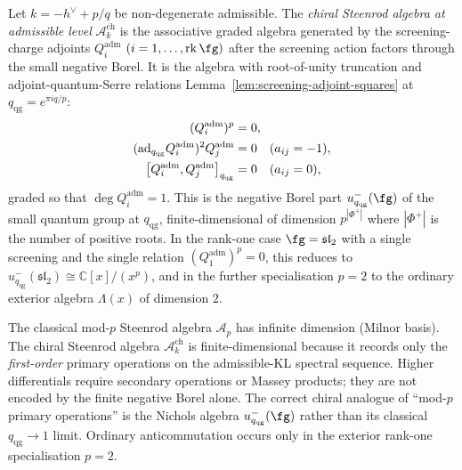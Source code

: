 \begin{definition}
\label{def:chiral-steenrod}
%
Let $k = -h^\vee + p/q$ be non-degenerate admissible. The
\emph{chiral Steenrod algebra at admissible level}
$\mathcal{A}^{\mathrm{ch}}_k$ is the associative graded algebra
generated by the screening-charge adjoints
$Q_i^{\mathrm{adm}}$ $(i = 1, \ldots, \mathrm{rk}\,\fg)$ after the
screening action factors through the small negative Borel.  It is
the algebra with root-of-unity truncation and adjoint-quantum-Serre
relations
Lemma~\ref{lem:screening-adjoint-squares} at
$q_{\mathrm{qg}} = e^{\pi i q/p}$:
\begin{align}\label{eq:chiral-steenrod-relations}
(Q_i^{\mathrm{adm}})^p &= 0, \notag \\
(\mathrm{ad}_{q_{\mathrm{qg}}} Q_i^{\mathrm{adm}})^2
Q_j^{\mathrm{adm}} &= 0 \quad (a_{ij} = -1), \\
\bigl[Q_i^{\mathrm{adm}}, Q_j^{\mathrm{adm}}\bigr]_{q_{\mathrm{qg}}}
&= 0 \quad (a_{ij} = 0), \notag
\end{align}
graded so that $\deg Q_i^{\mathrm{adm}} = 1$. This is the negative
Borel part $u_{q_{\mathrm{qg}}}^-(\fg)$ of the small quantum group
at $q_{\mathrm{qg}}$, finite-dimensional of dimension
$p^{|\Phi^+|}$ where $|\Phi^+|$ is the number of positive roots.
In the rank-one case $\fg = \mathfrak{sl}_2$ with a single screening
and the single relation $(Q_1^{\mathrm{adm}})^p = 0$, this reduces
to $u_{q_{\mathrm{qg}}}^-(\mathfrak{sl}_2) \cong \mathbb{C}[x]/(x^p)$,
and in the further specialisation $p = 2$ to the ordinary exterior
algebra $\Lambda(x)$ of dimension $2$.
\end{definition}

\begin{remark}
\label{rem:chiral-vs-classical-steenrod}
The classical mod-$p$ Steenrod algebra $\mathcal{A}_p$ has
infinite dimension (Milnor basis). The chiral Steenrod algebra
$\mathcal{A}^{\mathrm{ch}}_k$ is finite-dimensional because it
records only the \emph{first-order} primary operations on the
admissible-KL spectral sequence.  Higher differentials require
secondary operations or Massey products; they are not encoded by the
finite negative Borel alone.  The correct chiral analogue of
``mod-$p$ primary operations'' is the Nichols algebra
$u_{q_{\mathrm{qg}}}^-(\fg)$ rather than its classical
$q_{\mathrm{qg}}\to1$ limit.  Ordinary anticommutation occurs only
in the exterior rank-one specialisation $p=2$.
\end{remark}

